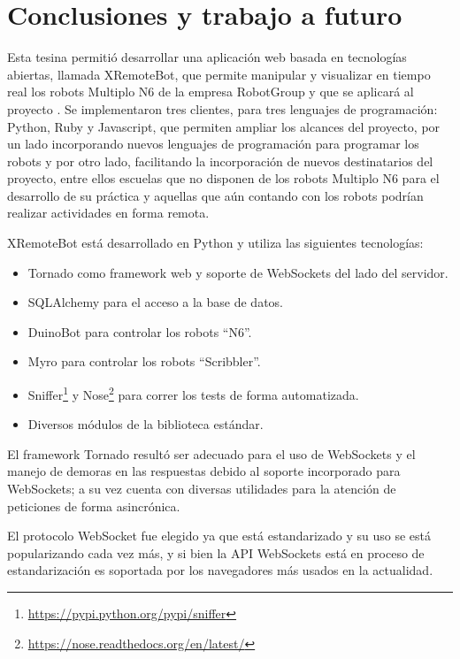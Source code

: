 \chapter{Conclusiones y trabajo a futuro}\label{cha:conclusiones}
Esta tesina permitió desarrollar una aplicación web basada en tecnologías
abiertas, llamada XRemoteBot, que permite manipular y visualizar en tiempo
real los robots Multiplo N6 de la empresa RobotGroup y que se aplicará al
proyecto \proyecto{}. Se implementaron tres clientes, para tres lenguajes de
programación: Python, Ruby y Javascript, que permiten ampliar los alcances
del proyecto, por un lado incorporando nuevos lenguajes de programación para
programar los robots y por otro lado, facilitando la incorporación de nuevos
destinatarios del proyecto, entre ellos escuelas que no disponen de los
robots Multiplo N6 para el desarrollo de su práctica y aquellas que aún
contando con los robots podrían realizar actividades en forma remota.

XRemoteBot está desarrollado en Python y utiliza las siguientes tecnologías:
\begin{itemize}
    \item Tornado como framework web y soporte de WebSockets del lado del
    servidor.
    \item SQLAlchemy para el acceso a la base de datos.
    \item DuinoBot para controlar los robots ``N6''.
    \item Myro para controlar los robots ``Scribbler''.
    \item Sniffer\footnote{\url{https://pypi.python.org/pypi/sniffer}} y
    Nose\footnote{\url{https://nose.readthedocs.org/en/latest/}} para correr
    los tests de forma automatizada.
    \item Diversos módulos de la biblioteca estándar.
\end{itemize}

El framework Tornado resultó ser adecuado para el uso de WebSockets y el
manejo de demoras en las respuestas debido al soporte incorporado para
WebSockets; a su vez cuenta con diversas utilidades para la atención de
peticiones de forma asincrónica.

El protocolo WebSocket fue
elegido ya que está estandarizado y su uso se está popularizando cada vez más,
y si bien la API WebSockets está en proceso de estandarización es soportada
por los navegadores más usados en la actualidad.

